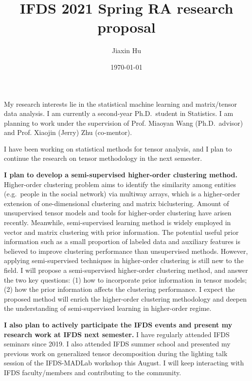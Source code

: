 \documentclass[11pt]{article}
\title{IFDS 2021 Spring RA research proposal}
\date{\today}
\author{%
Jiaxin Hu
}
\theoremstyle{plain}
\theoremstyle{definition}
\begin{document}

\maketitle

My research interests lie in the statistical machine learning and matrix/tensor data analysis. I am currently a second-year Ph.D.\ student in Statistics. I am planning to work under the supervision of Prof. Miaoyan Wang (Ph.D.\ advisor) and Prof. Xiaojin (Jerry) Zhu (co-mentor).

I have been working on statistical methods for tensor analysis, and I plan to continue the research on tensor methodology in the next semester. 

\textbf{I plan to develop a semi-supervised higher-order clustering method.} Higher-order clustering problem aims to identify the similarity among entities (e.g.\ people in the social network) via multiway arrays, which is a higher-order extension of one-dimensional clustering and matrix biclustering. Amount of unsupervised tensor models and tools for higher-order clustering have arisen recently. Meanwhile, semi-supervised learning method is widely employed in vector and matrix clustering with prior information. The potential useful prior information such as a small proportion of labeled data and auxiliary features is believed to improve clustering performance than unsupervised methods. However, applying semi-supervised techniques in higher-order clustering is still new to the field. I will propose a semi-supervised higher-order clustering method, and answer the two key questions: (1) how to incorporate prior information in tensor models; (2) how the prior information affects the clustering performance. I expect the proposed method will enrich the higher-order clustering methodology and deepen the understanding of semi-supervised learning in higher-order regime.

\textbf{I also plan to actively participate the IFDS events and present my research work at IFDS next semester.} I have regularly attended IFDS seminars since 2019. I also attended IFDS summer school and presented my previous work on generalized tensor decomposition during the lighting talk session of the IFDS-MADLab workshop this August. I will keep interacting with IFDS faculty/members and contributing to the community.
\end{document}
